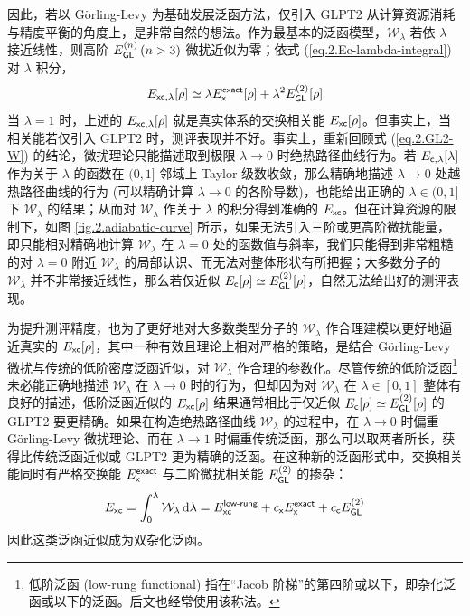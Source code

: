 因此，若以 G\"orling-Levy 为基础发展泛函方法，仅引入 GLPT2 从计算资源消耗与精度平衡的角度上，是非常自然的想法。作为最基本的泛函模型，$\mathcal{W}_{\lambda}$ 若依 $\lambda$ 接近线性，则高阶 $E_{\textsf{GL}}^{(n)} \, (n > 3)$ 微扰近似为零；依式 (\ref{eq.2.Ec-lambda-integral}) 对 $\lambda$ 积分，
\begin{equation}
  E_{\textsf{xc}, \lambda} [\rho] \simeq \lambda E_{\textsf{x}}^{\textsf{exact}}[\rho] + \lambda^2 E_{\textsf{GL}}^{(2)} [\rho]
\end{equation}
当 $\lambda = 1$ 时，上述的 $E_{\textsf{xc}, \lambda} [\rho]$ 就是真实体系的交换相关能 $E_{\textsf{xc}} [\rho]$。但事实上，当相关能若仅引入 GLPT2 时，测评表现并不好\cite{Su-Xu.JCP.2014}。事实上，重新回顾式 (\ref{eq.2.GL2-W}) 的结论，微扰理论只能描述取到极限 $\lambda \rightarrow 0$ 时绝热路径曲线行为。若 $E_{\textsf{c}, \lambda} [\lambda]$ 作为关于 $\lambda$ 的函数在 $(0, 1]$ 邻域上 Taylor 级数收敛，那么精确地描述 $\lambda \rightarrow 0$ 处越热路径曲线的行为 (可以精确计算 $\lambda \rightarrow 0$ 的各阶导数)，也能给出正确的 $\lambda \in (0, 1]$ 下 $\mathcal{W}_{\lambda}$ 的结果；从而对 $\mathcal{W}_{\lambda}$ 作关于 $\lambda$ 的积分得到准确的 $E_{\textsf{xc}}$。但在计算资源的限制下，如图 \ref{fig.2.adiabatic-curve} 所示，如果无法引入三阶或更高阶微扰能量，即只能相对精确地计算 $\mathcal{W}_{\lambda}$ 在 $\lambda = 0$ 处的函数值与斜率，我们只能得到非常粗糙的对 $\lambda = 0$ 附近 $\mathcal{W}_{\lambda}$ 的局部认识、而无法对整体形状有所把握；大多数分子的 $\mathcal{W}_{\lambda}$ 并不非常接近线性，那么若仅近似 $E_{\textsf{c}} [\rho] \simeq E_{\textsf{GL}}^{(2)} [\rho]$，自然无法给出好的测评表现。

为提升测评精度，也为了更好地对大多数类型分子的 $\mathcal{W}_{\lambda}$ 作合理建模以更好地逼近真实的 $E_{\textsf{xc}} [\rho]$，其中一种有效且理论上相对严格的策略，是结合 G\"orling-Levy 微扰与传统的低阶密度泛函近似，对 $\mathcal{W}_{\lambda}$ 作合理的参数化。尽管传统的低阶泛函\footnote{低阶泛函 (low-rung functional) 指在“Jacob 阶梯”的第四阶或以下，即杂化泛函或以下的泛函。后文也经常使用该称法。}未必能正确地描述 $\mathcal{W}_{\lambda}$ 在 $\lambda \rightarrow 0$ 时的行为，但却因为对 $\mathcal{W}_{\lambda}$ 在 $\lambda \in [0, 1]$ 整体有良好的描述，低阶泛函近似的 $E_{\textsf{xc}} [\rho]$ 结果通常相比于仅近似 $E_{\textsf{c}} [\rho] \simeq E_{\textsf{GL}}^{(2)} [\rho]$ 的 GLPT2 要更精确。如果在构造绝热路径曲线 $\mathcal{W}_{\lambda}$ 的过程中，在 $\lambda \rightarrow 0$ 时偏重 G\"orling-Levy 微扰理论、而在 $\lambda \rightarrow 1$ 时偏重传统泛函，那么可以取两者所长，获得比传统泛函近似或 GLPT2 更为精确的泛函。在这种新的泛函形式中，交换相关能同时有严格交换能 $E_{\textsf{x}}^{\textsf{exact}}$ 与二阶微扰相关能 $E_{\textsf{GL}}^{(2)}$ 的掺杂：
\begin{equation}
  E_{\textsf{xc}} = \int_0^\lambda \mathcal{W}_{\lambda} \, \mathrm{d} \lambda = E_{\textsf{xc}}^{\textsf{low-rung}} + c_{\textsf{x}} E_{\textsf{x}}^{\textsf{exact}} + c_{\textsf{c}} E_{\textsf{GL}}^{(2)}
\end{equation}
因此这类泛函近似成为双杂化泛函。

